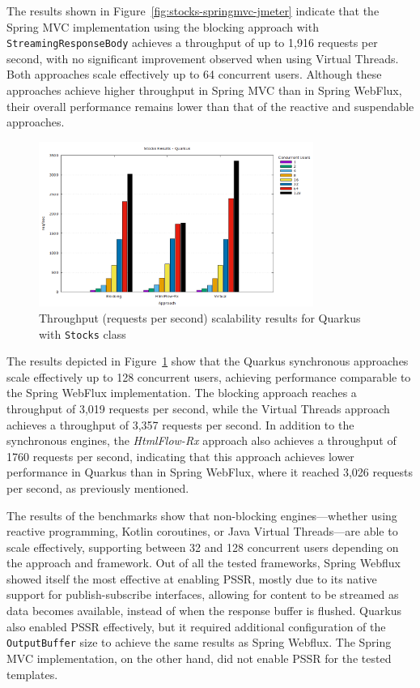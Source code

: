 The results shown in Figure~\ref{fig:stocks-springmvc-jmeter} indicate that the
Spring MVC implementation using the blocking approach with
\texttt{StreamingResponseBody} achieves a throughput of up to 1,916 requests
per second, with no significant improvement observed when using Virtual
Threads. Both approaches scale effectively up to 64 concurrent users. Although
these approaches achieve higher throughput in Spring MVC than in Spring
WebFlux, their overall performance remains lower than that of the reactive and
suspendable approaches.

\begin{figure}[h]
     \centering
     \includegraphics[width=0.8\textwidth]{./Graphs/stocks-quarkus-jmeter.png}
     \caption{Throughput (requests per second) scalability results for Quarkus with \texttt{Stocks} class}\label{fig:stocks-quarkus-jmeter}
\end{figure}

The results depicted in Figure~\ref{fig:stocks-quarkus-jmeter} show that the
Quarkus synchronous approaches scale effectively up to 128 concurrent users,
achieving performance comparable to the Spring WebFlux implementation. The
blocking approach reaches a throughput of 3,019 requests per second, while the
Virtual Threads approach achieves a throughput of 3,357 requests per second. In
addition to the synchronous engines, the \textit{HtmlFlow-Rx} approach also
achieves a throughput of 1760 requests per second, indicating that this
approach achieves lower performance in Quarkus than in Spring WebFlux, where it
reached 3,026 requests per second, as previously mentioned.

The results of the benchmarks show that non-blocking engines—whether using
reactive programming, Kotlin coroutines, or Java Virtual Threads—are able to
scale effectively, supporting between 32 and 128 concurrent users depending on
the approach and framework. Out of all the tested frameworks, Spring Webflux
showed itself the most effective at enabling PSSR, mostly due to its native
support for publish-subscribe interfaces, allowing for content to be streamed
as data becomes available, instead of when the response buffer is flushed.
Quarkus also enabled PSSR effectively, but it required additional configuration
of the \texttt{OutputBuffer} size to achieve the same results as Spring
Webflux. The Spring MVC implementation, on the other hand, did not enable PSSR
for the tested templates.

